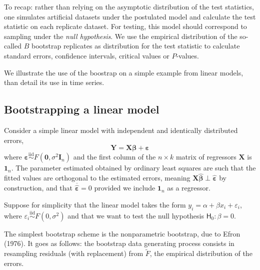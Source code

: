 \documentclass[]{book}
\begin{document}
To recap: rather than relying on the asymptotic distribution of the test
statistics, one simulates artificial datasets under the postulated model
and calculate the test statistic on each replicate dataset. For testing,
this model should correspond to sampling under the \emph{null
hypothesis}. We use the empirical distribution of the so-called \(B\)
bootstrap replicates as distribution for the test statistic to calculate
standard errors, confidence intervals, critical values or \(P\)-values.

We illustrate the use of the boostrap on a simple example from linear
models, than detail its use in time series.

\subsection{Bootstrapping a linear
model}\label{bootstrapping-a-linear-model}

Consider a simple linear model with independent and identically
distributed errors,
\[\boldsymbol{Y} = \mathbf{X}\boldsymbol{\beta}+\boldsymbol{\varepsilon}\]
where
\(\boldsymbol{\varepsilon} \stackrel{\mathrm{iid}}{\sim} F(\boldsymbol{0}, \sigma^2\mathbf{I}_n)\)
and the first column of the \(n \times k\) matrix of regressors
\(\mathbf{X}\) is \(\boldsymbol{1}_n\). The parameter estimated obtained
by ordinary least squares are such that the fitted values are orthogonal
to the estimated errors, meaning
\(\mathbf{X}\hat{\boldsymbol{\beta}} \perp \hat{\boldsymbol{\varepsilon}}\)
by construction, and that
\(\overline{\hat{\boldsymbol{\varepsilon}}} = 0\) provided we include
\(\boldsymbol{1}_n\) as a regressor.

Suppose for simplicity that the linear model takes the form
\(y_i=\alpha+\beta x_i + \varepsilon_i\), where
\(\varepsilon_i \stackrel{\mathrm{iid}}{\sim}F(0,\sigma^2)\) and that we
want to test the null hypothesis \(\mathsf{H}_0: \beta=0\).

The simplest bootstrap scheme is the nonparametric bootstrap, due to
Efron (1976). It goes as follows: the bootstrap data generating process
consists in resampling residuals (with replacement) from \(\tilde{F}\),
the empirical distribution of the errors.
\end{document}
